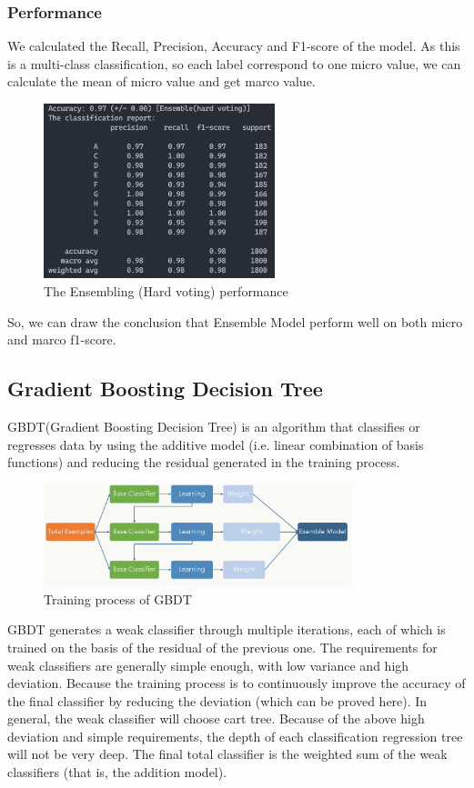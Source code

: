 \documentclass[11pt,en]{elegantpaper}
\begin{document}
\subsubsection*{Performance}
We calculated the Recall, Precision, Accuracy and F1-score of the model. As this is a multi-class classification, so each label correspond to one micro value, we can calculate the mean of micro value and get marco value.
\begin{figure}[H]
	\centering
	\includegraphics[width=0.6\textwidth]{image/hvpf}
	\caption{The Ensembling (Hard voting) performance}
	\label{hvpf}
\end{figure}
So, we can draw the conclusion that Ensemble Model perform well on both micro and marco f1-score.

\subsection{Gradient Boosting Decision Tree}
GBDT(Gradient Boosting Decision Tree) is an algorithm that classifies or regresses data by using the additive model (i.e. linear combination of basis functions) and reducing the residual generated in the training process.

\begin{figure}[H]
	\centering
	\includegraphics[width=0.8\textwidth]{image/gbdt_1}
	\caption{Training process of GBDT}
	\label{gbdt1}
\end{figure}

GBDT generates a weak classifier through multiple iterations, each of which is trained on the basis of the residual of the previous one. The requirements for weak classifiers are generally simple enough, with low variance and high deviation. Because the training process is to continuously improve the accuracy of the final classifier by reducing the deviation (which can be proved here).
In general, the weak classifier will choose cart tree. Because of the above high deviation and simple requirements, the depth of each classification regression tree will not be very deep. The final total classifier is the weighted sum of the weak classifiers (that is, the addition model).
\end{document}
